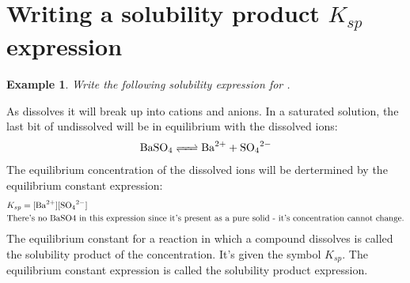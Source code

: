 \documentclass{article}  %
\newtheorem{exmp}{Example}
\begin{document}
\section*{Writing a solubility product $K_{sp}$ expression}
\begin{exmp}
    Write the following solubility expression for .
\end{exmp}
As  dissolves it will break up into  cations and  anions. In a saturated solution, the last bit of undissolved  will be in equilibrium with the dissolved ions:
\begin{equation*}
    \begin{aligned}
        \ce{BaSO4 <=> Ba^2+ + SO4^2-}
    \end{aligned}
\end{equation*}
The equilibrium concentration of the dissolved ions will be dertermined by the equilibrium constant expression:
\begin{equation*}
    \begin{aligned}
        &K_{sp} = \ce{[Ba^2+][SO4^2-]} \\
        &\text{There's no BaSO4 in this expression since it's present as a pure solid - it's concentration cannot change.}
    \end{aligned}
\end{equation*}
The equilibrium constant for a reaction in which a compound dissolves is called the solubility product of the concentration. It's given the symbol $K_{sp}$. The equilibrium constant expression is called the solubility product expression.
\end{document}
